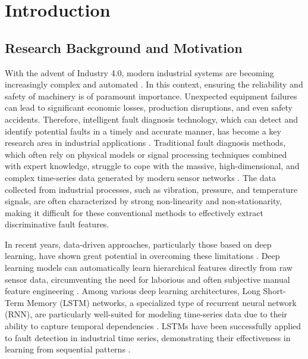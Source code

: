 \chapter{Introduction}
\label{cha:introduction}

\section{Research Background and Motivation}
\label{sec:introduction:background_motivation}

With the advent of Industry 4.0, modern industrial systems are becoming increasingly complex and automated \cite{chen2017industry}. In this context, ensuring the reliability and safety of machinery is of paramount importance. Unexpected equipment failures can lead to significant economic losses, production disruptions, and even safety accidents. Therefore, intelligent fault diagnosis technology, which can detect and identify potential faults in a timely and accurate manner, has become a key research area in industrial applications \cite{zhang2019deep, zhao2019deep}. Traditional fault diagnosis methods, which often rely on physical models or signal processing techniques combined with expert knowledge, struggle to cope with the massive, high-dimensional, and complex time-series data generated by modern sensor networks \cite{lei2016intelligent}. The data collected from industrial processes, such as vibration, pressure, and temperature signals, are often characterized by strong non-linearity and non-stationarity, making it difficult for these conventional methods to effectively extract discriminative fault features.

In recent years, data-driven approaches, particularly those based on deep learning, have shown great potential in overcoming these limitations \cite{liu2018artificial}. Deep learning models can automatically learn hierarchical features directly from raw sensor data, circumventing the need for laborious and often subjective manual feature engineering \cite{khan2018review}. Among various deep learning architectures, Long Short-Term Memory (LSTM) networks, a specialized type of recurrent neural network (RNN), are particularly well-suited for modeling time-series data due to their ability to capture temporal dependencies \cite{hochreiter1997long}. LSTMs have been successfully applied to fault detection in industrial time series, demonstrating their effectiveness in learning from sequential patterns \cite{filonov2016multivariateindustrialtimeseries}. 

